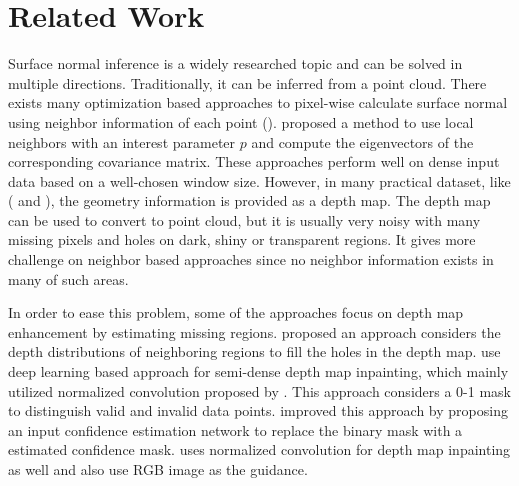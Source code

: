 
\chapter{Related Work} %

\label{ch:02} %

Surface normal inference is a widely researched topic and can be solved in multiple directions. Traditionally, it can be inferred from a point cloud. There exists many optimization based approaches to pixel-wise calculate surface normal using neighbor information of each point (\cite{optimized-methods}). \cite{Holzer.S} proposed a method to use local neighbors with an interest parameter $ p $ and compute the eigenvectors of the corresponding covariance matrix. These approaches perform well on dense input data based on a well-chosen window size. However, in many practical dataset, like  (\cite{nyu} and \cite{kitti-depth}), the geometry information is provided as a depth map. The depth map can be used to convert to point cloud, but it is usually very noisy with many missing pixels and holes on dark, shiny or transparent regions. It gives more challenge on neighbor based approaches since no neighbor information exists in many of such areas. 

In order to ease this problem, some of the approaches focus on depth map enhancement by estimating missing regions. \cite{depth-inpainting-distribution} proposed an approach considers the depth distributions of neighboring regions to fill the holes in the depth map. \cite{ncnn} use deep learning based approach for semi-dense depth map inpainting, which mainly utilized normalized convolution proposed by \cite{nconv}. This approach considers a 0-1 mask to distinguish valid and invalid data points. \cite{pncnn} improved this approach by proposing an input confidence estimation network to replace the binary mask with a estimated confidence mask. \cite{depth-enhance-guided} uses normalized convolution for depth map inpainting as well and also use RGB image as the guidance. 

